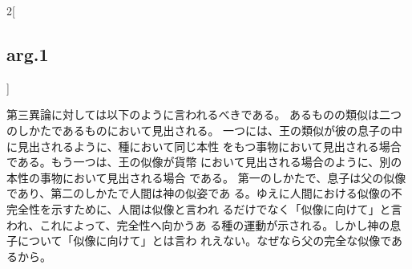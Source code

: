 \documentclass[paper=a4paper,fontsize=10pt,jafontsize=9pt,titlepage]{jlreq}
\begin{document}
\begin{paracol}{2}[\subsection{arg.1}]
\switchcolumn

第三異論に対しては以下のように言われるべきである。
あるものの類似は二つのしかたであるものにおいて見出される。
一つには、王の類似が彼の息子の中に見出されるように、種において同じ本性
 をもつ事物において見出される場合である。もう一つは、王の似像が貨幣
 において見出される場合のように、別の本性の事物において見出される場合
 である。
第一のしかたで、息子は父の似像であり、第二のしかたで人間は神の似姿であ
 る。ゆえに人間における似像の不完全性を示すために、人間は似像と言われ
 るだけでなく「似像に向けて」と言われ、これによって、完全性へ向かうあ
 る種の運動が示される。しかし神の息子について「似像に向けて」とは言わ
 れえない。なぜなら父の完全な似像であるから。

\end{paracol}
\newpage
\end{document}
